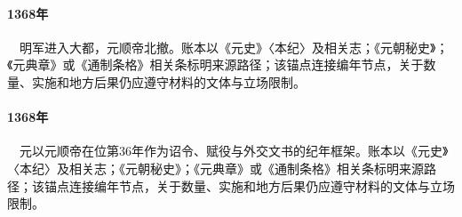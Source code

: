 \paragraph{1368年}　明军进入大都，元顺帝北撤。账本以《元史》〈本纪〉及相关志；《元朝秘史》；《元典章》或《通制条格》相关条标明来源路径；该锚点连接编年节点，关于数量、实施和地方后果仍应遵守材料的文体与立场限制。

\paragraph{1368年}　元以元顺帝在位第36年作为诏令、赋役与外交文书的纪年框架。账本以《元史》〈本纪〉及相关志；《元朝秘史》；《元典章》或《通制条格》相关条标明来源路径；该锚点连接编年节点，关于数量、实施和地方后果仍应遵守材料的文体与立场限制。
